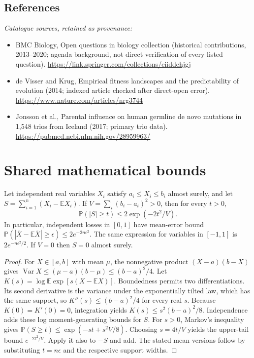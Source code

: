 \documentclass[11pt]{article}
\begin{document}
\subsection{References}
\noindent\emph{Catalogue sources, retained as provenance:}
\begin{itemize}
\item BMC Biology, Open questions in biology collection (historical contributions, 2013--2020; agenda background, not direct verification of every listed question). \url{https://link.springer.com/collections/eiiddehjgj}
\item de Visser and Krug, Empirical fitness landscapes and the predictability of evolution (2014; indexed article checked after direct-open error). \url{https://www.nature.com/articles/nrg3744}
\item Jonsson et al., Parental influence on human germline de novo mutations in 1,548 trios from Iceland (2017; primary trio data). \url{https://pubmed.ncbi.nlm.nih.gov/28959963/}
\end{itemize}




\section{Shared mathematical bounds}\label{app:bounds}
\begin{lemma}\label{lem:bounded}
Let independent real variables $X_i$ satisfy $a_i\leq X_i\leq b_i$ almost surely,
and let $S=\sum_{i=1}^n(X_i-\mathbb{E} X_i)$. If
$V=\sum_i(b_i-a_i)^2>0$, then for every $t>0$,
\[
 \mathbb{P}(|S|\geq t)\leq 2\exp(-2t^2/V).
\]
In particular, independent losses in $[0,1]$ have mean-error bound
$\mathbb{P}(|\overline X-\mathbb{E}\overline X|\geq\epsilon)
\leq2e^{-2n\epsilon^2}$. The same expression for variables in $[-1,1]$
is $2e^{-n\epsilon^2/2}$. If $V=0$ then $S=0$ almost surely.
\end{lemma}
\begin{proof}
For $X\in[a,b]$ with mean $\mu$, the nonnegative product
$(X-a)(b-X)$ gives
$\operatorname{Var} X\leq(\mu-a)(b-\mu)\leq(b-a)^2/4$.
Let $K(s)=\log\mathbb{E}\exp[s(X-\mathbb{E} X)]$.
Boundedness permits two differentiations. Its second derivative is the variance
under the exponentially tilted law, which has the same support, so
$K''(s)\leq(b-a)^2/4$ for every real $s$.
Because $K(0)=K'(0)=0$, integration yields
$K(s)\leq s^2(b-a)^2/8$.
Independence adds these log moment-generating bounds for $S$.
For $s>0$, Markov's inequality gives
$\mathbb{P}(S\geq t)\leq\exp(-st+s^2V/8)$.
Choosing $s=4t/V$ yields the upper-tail bound $e^{-2t^2/V}$.
Apply it also to $-S$ and add. The stated mean versions follow by substituting
$t=n\epsilon$ and the respective support widths.
\end{proof}
\end{document}
